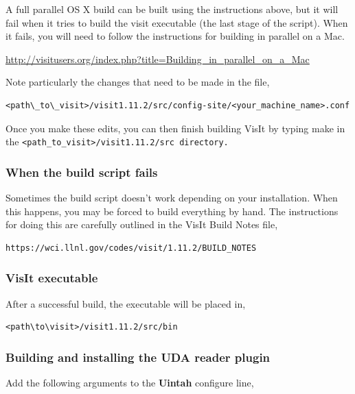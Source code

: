 \documentclass[12pt]{article}
\begin{document}
A full parallel OS X build can be built using the instructions above,
but it will fail when it tries to build the visit executable (the last
stage of the script). When it fails, you will need to follow the
instructions for building in parallel on a Mac.

\url{http://visitusers.org/index.php?title=Building_in_parallel_on_a_Mac}

  
Note particularly the changes that need to be made in the file, 

\begin{verbatim}
<path\_to\_visit>/visit1.11.2/src/config-site/<your_machine_name>.conf
\end{verbatim}

\normalfont Once you make these edits, you can then finish building VisIt by typing make in the \tt <path\_to\_visit>/visit1.11.2/src \normalfont directory.  

\subsubsection{When the build script fails}
\label{sec:WhenTheBuildsSriptFails}

Sometimes the build script doesn't work depending on your
installation. When this happens, you may be forced to build everything
by hand. The instructions for doing this are carefully outlined in the
VisIt Build Notes file,

\begin{verbatim}
https://wci.llnl.gov/codes/visit/1.11.2/BUILD_NOTES
\end{verbatim}

\subsubsection{VisIt executable}
\label{sec:VisItExecutable}

After a successful build, the executable will be placed in,

\begin{verbatim}
<path\to\visit>/visit1.11.2/src/bin
\end{verbatim}

\subsubsection{Building and installing the UDA reader plugin}
\label{sec:BuildingAndInstallingUDAPlugin}

Add the following arguments to the \textbf{Uintah} configure line,
\end{document}
